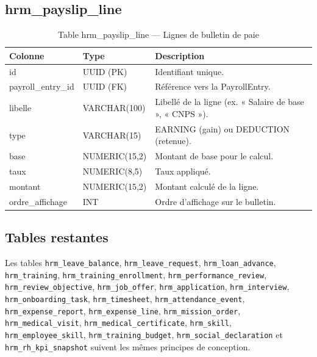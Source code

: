 \documentclass[a4paper,12pt,openany]{book}
\begin{document}
    \subsection{hrm\_payslip\_line}
    \begin{table}[H]
        \centering
        \caption{Table hrm\_payslip\_line — Lignes de bulletin de paie}
        \begin{tabularx}{\textwidth}{llX}
    \toprule
    \textbf{Colonne} & \textbf{Type} & \textbf{Description} \\
    \midrule
    id                 & UUID (PK)       & Identifiant unique. \\
    payroll\_entry\_id & UUID (FK)       & Référence vers la PayrollEntry. \\
    libelle            & VARCHAR(100)    & Libellé de la ligne (ex. « Salaire de base », « CNPS »). \\
    type               & VARCHAR(15)     & EARNING (gain) ou DEDUCTION (retenue). \\
    base               & NUMERIC(15,2)   & Montant de base pour le calcul. \\
    taux               & NUMERIC(8,5)    & Taux appliqué. \\
    montant            & NUMERIC(15,2)   & Montant calculé de la ligne. \\
    ordre\_affichage   & INT             & Ordre d'affichage sur le bulletin. \\
    \bottomrule
        \end{tabularx}
    \end{table}

    \subsection{Tables restantes}

    Les tables \texttt{hrm\_leave\_balance}, \texttt{hrm\_leave\_request}, \texttt{hrm\_loan\_advance}, \texttt{hrm\_training}, \texttt{hrm\_training\_enrollment}, \texttt{hrm\_performance\_review}, \texttt{hrm\_review\_objective}, \texttt{hrm\_job\_offer}, \texttt{hrm\_application}, \texttt{hrm\_interview}, \texttt{hrm\_onboarding\_task}, \texttt{hrm\_timesheet}, \texttt{hrm\_attendance\_event}, \texttt{hrm\_expense\_report}, \texttt{hrm\_expense\_line}, \texttt{hrm\_mission\_order}, \texttt{hrm\_medical\_visit}, \texttt{hrm\_medical\_certificate}, \texttt{hrm\_skill}, \texttt{hrm\_employee\_skill}, \texttt{hrm\_training\_budget}, \texttt{hrm\_social\_declaration} et \texttt{hrm\_rh\_kpi\_snapshot} suivent les mêmes principes de conception.
\end{document}
